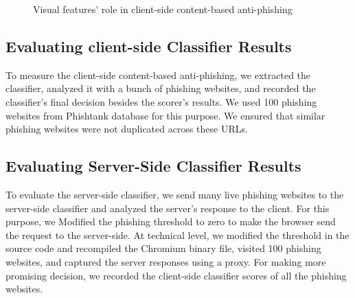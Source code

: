  \begin{figure}[h!]
\centering
{}
\caption{Visual features' role in client-side content-based anti-phishing}
\label{fig:visual features}
\end{figure} 

\subsection{Evaluating client-side Classifier Results}
To measure the client-side content-based anti-phishing, we extracted the classifier, analyzed it with a bunch of phishing websites, and recorded the classifier's final decision besides the scorer's results.
We used 100 phishing websites from Phishtank database for this purpose.
We ensured that similar phishing websites were not duplicated across these URLs.

\subsection{Evaluating Server-Side Classifier Results}
To evaluate the server-side classifier, we send many live phishing websites to the server-side classifier and analyzed the server's response to the client. For this purpose, we Modified the phishing threshold to zero to make the browser send the request to the server-side. At technical level,  we modified the threshold in the source code and recompiled the Chromium binary file, visited 100 phishing websites, and captured the server responses using a proxy. For making more promising decision, we recorded the client-side classifier scores of all the phishing websites.

